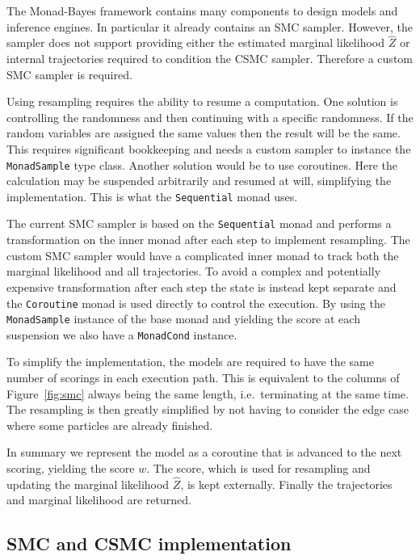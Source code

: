 The Monad-Bayes framework contains many components to design models and inference engines.
In particular it already contains an SMC sampler.
However, the sampler does not support providing either the estimated marginal likelihood $\hat Z$ or internal trajectories required to condition the CSMC sampler.
Therefore a custom SMC sampler is required.

Using resampling requires the ability to resume a computation.
One solution is  controlling the randomness and then continuing with a specific randomness.
If the random variables are assigned the same values then the result will be the same.
This requires significant bookkeeping and needs a custom sampler to instance the \texttt{MonadSample} type class.
Another solution would be to use coroutines.
Here the calculation may be suspended arbitrarily and resumed at will, simplifying the implementation.
This is what the \texttt{Sequential} monad uses.

The current SMC sampler is based on the \texttt{Sequential} monad and performs a transformation on the inner monad after each step to implement resampling.
The custom SMC sampler would have a complicated inner monad to track both the marginal likelihood and all trajectories.
To avoid a complex and potentially expensive transformation after each step the state is instead kept separate and the \texttt{Coroutine} monad is used directly to control the execution.
By using the \texttt{MonadSample} instance of the base monad and yielding the score at each suspension we also have a \texttt{MonadCond} instance.

To simplify the implementation, the models are required to have the same number of scorings in each execution path. This is equivalent to the columns of Figure~\ref{fig:smc} always being the same length, i.e.\ terminating at the same time. The resampling is then greatly simplified by not having to consider the edge case where some particles are already finished.

In summary we represent the model as a coroutine that is advanced to the next scoring, yielding the score $w$. The score, which is used for resampling and updating the marginal likelihood $\hat Z$, is kept externally. Finally the trajectories and marginal likelihood are returned.

\subsection{SMC and CSMC implementation}

